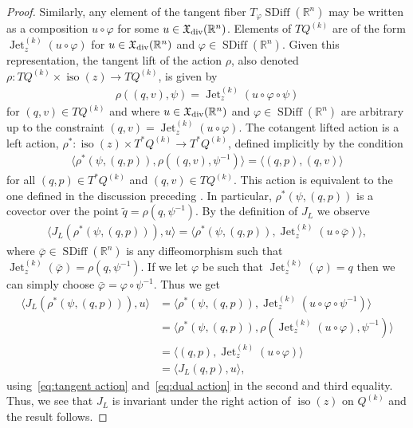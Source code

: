\documentclass[12pt]{amsart}
\newcommand{\R}{\ensuremath{\mathbb{R}}}
\DeclareMathOperator{\SDiff}{SDiff}
\DeclareMathOperator{\Jet}{Jet}
\DeclareMathOperator{\iso}{iso}
\begin{document}
\begin{proof}
	Similarly, any element of the tangent fiber $T_\varphi \SDiff(\R^n)$ may be written as a composition $u \circ \varphi$ for some $u \in \mathfrak{X}_{\rm div}(\R^n)$.
	Elements of $TQ^{(k)}$ are of the form $\Jet_z^{(k)}( u \circ \varphi)$ for $u \in \mathfrak{X}_{\rm div}(\R^n)$ and $\varphi \in \SDiff(\R^n)$.
	Given this representation, the tangent lift of the action $\rho$, also denoted $\rho: TQ^{(k)} \times \iso(z) \to TQ^{(k)}$, is given by
	\begin{align}
		\rho( (q,v)  , \psi ) = \Jet_z^{(k)}( u \circ \varphi \circ \psi ) \label{eq:tangent action}
	\end{align}
	for $(q,v) \in TQ^{(k)}$ and where $u \in \mathfrak{X}_{\rm div}(\R^n)$ and $\varphi \in \SDiff( \R^n)$ are arbitrary up to the constraint $(q,v) = \Jet_{z}^{(k)}( u \circ \varphi)$.
	The cotangent lifted action is a left action, $\rho^* : \iso(z) \times T^*Q^{(k)} \to T^*Q^{(k)}$, defined implicitly by the condition
	\begin{align}
		\langle \rho^*( \psi , (q,p) ) , \rho( (q,v) , \psi^{-1} ) \rangle = \langle (q,p) , (q,v) \rangle \label{eq:dual action}
	\end{align}
	for all $(q,p) \in T^*Q^{(k)}$ and $(q,v) \in TQ^{(k)}$.
	This action is equivalent to the one defined in the discussion preceding \cite[Corollary 4.2.11]{FOM}.
	In particular, $\rho^*( \psi , (q,p) )$ is a covector over the point $\tilde{q} = \rho( q , \psi^{-1})$.
	By the definition of $J_L$ we observe
	\begin{align*}
		\langle J_L( \rho^*( \psi , (q,p) ) ) , u \rangle = \langle  \rho^*( \psi ,  (q,p) ) , \Jet^{(k)}_z ( u \circ \bar{\varphi} ) \rangle, 
	\end{align*}
	where $\bar{\varphi} \in \SDiff(\R^n)$ is any diffeomorphism such that $\Jet_z^{(k)}( \bar{\varphi} ) = \rho( q , \psi^{-1} )$.
	If we let $\varphi$ be such that $\Jet^{(k)}_z( \varphi ) = q$ then we can simply choose $\bar{\varphi} = \varphi \circ \psi^{-1}$.
	Thus we get
	\begin{align*}
			\langle J_L( \rho^*( \psi , (q,p) ) ) , u \rangle &= \langle  \rho^*( \psi ,  (q,p) ) , \Jet^{(k)}_z ( u \circ \varphi \circ \psi^{-1} ) \rangle \\
			&= \langle  \rho^*( \psi ,  (q,p) )  ,  \rho( \Jet_z^{(k)}(u \circ \varphi) , \psi^{-1} ) \rangle \\
			&= \langle (q,p) , \Jet_z^{(k)}( u \circ \varphi) \rangle \\
			&= \langle J_L(q,p) , u \rangle, 
	\end{align*}
	using~\eqref{eq:tangent action} and~\eqref{eq:dual action} in the second and third equality.
	Thus, we see that $J_L$ is invariant under the right action of $\iso(z)$ on $Q^{(k)}$ and the result follows.
  \end{proof}
  
\end{document}
